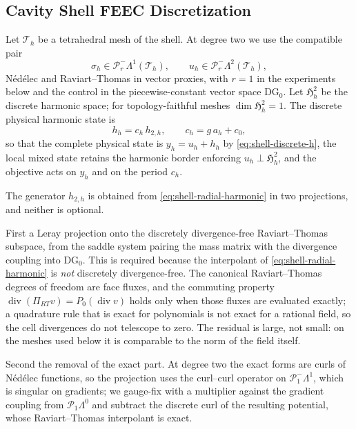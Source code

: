 \documentclass{article}
\DeclareMathOperator{\divergence}{div}
\newcommand{\HH}{\mathfrak H}
\begin{document}
\subsection{Cavity Shell FEEC Discretization}
\label{sec:shell-feec}
 
Let $\mathcal T_h$ be a tetrahedral mesh of the shell. At degree two we
use the compatible pair
\[
  \sigma_h\in\mathcal P^-_r\Lambda^1(\mathcal T_h),\qquad
  u_h\in\mathcal P^-_r\Lambda^2(\mathcal T_h),
\]
N\'ed\'elec and Raviart--Thomas in vector proxies, with $r=1$ in the
experiments below and the control in the piecewise-constant vector
space $\mathrm{DG}_0$. Let $\HH^2_h$ be the discrete harmonic space;
for topology-faithful meshes $\dim\HH^2_h=1$. The discrete physical
harmonic state is
\begin{equation}\label{eq:shell-discrete-h}
  h_h=c_h\,h_{2,h},\qquad c_h=g\,a_h+c_0,
\end{equation}
so that the complete physical state is $y_h=u_h+h_h$ by
\eqref{eq:shell-discrete-h}, the local mixed state
retains the harmonic border enforcing $u_h\perp\HH^2_h$, and the
objective acts on $y_h$ and on the period $c_h$.
 
The generator $h_{2,h}$ is obtained from
\eqref{eq:shell-radial-harmonic} in two projections, and neither is
optional.
 
First a Leray projection onto the discretely divergence-free
Raviart--Thomas subspace, from the saddle system pairing the mass
matrix with the divergence coupling into $\mathrm{DG}_0$. This is
required because the interpolant of \eqref{eq:shell-radial-harmonic} is
\emph{not} discretely divergence-free. The canonical Raviart--Thomas
degrees of freedom are face fluxes, and the commuting property
$\divergence(\Pi_{RT}v)=P_0(\divergence v)$ holds only when those
fluxes are evaluated exactly; a quadrature rule that is exact for
polynomials is not exact for a rational field, so the cell divergences
do not telescope to zero. The residual is large, not small: on the
meshes used below it is comparable to the norm of the field itself.
 
Second the removal of the exact part. At degree two the exact forms are
curls of N\'ed\'elec functions, so the projection uses the curl--curl
operator on $\mathcal P^-_1\Lambda^1$, which is singular on gradients;
we gauge-fix with a multiplier against the gradient coupling from
$\mathcal P_1\Lambda^0$ and subtract the discrete curl of the resulting
potential, whose Raviart--Thomas interpolant is exact.
 
\end{document}
